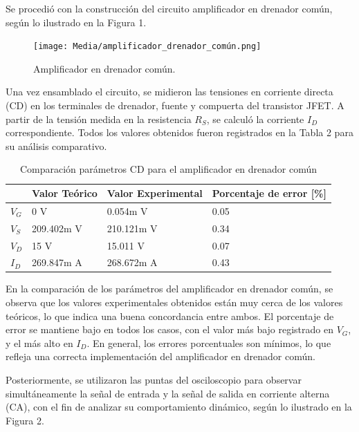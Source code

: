 \documentclass[journal]{IEEEtran}
\begin{document}
	\par Se procedió con la construcción del circuito amplificador en drenador común, según lo ilustrado en la Figura 1. 
	\begin{figure}[H]
		\centering
		\texttt{[image: Media/amplificador\_drenador\_común.png]}
		\caption{Amplificador en drenador común.}
		\label{fig:amplificador_drenador_común}
	\end{figure}
	\par Una vez ensamblado el circuito, se midieron las tensiones en corriente directa (CD) en los terminales de drenador, fuente y compuerta del transistor JFET. A partir de la tensión medida en la resistencia \( R_S \), se calculó la corriente \( I_D \) correspondiente. Todos los valores obtenidos fueron registrados en la Tabla 2 para su análisis comparativo.
	\begin{table}[h]
		\caption{Comparación parámetros CD para el amplificador en drenador común}
		\centering
		\renewcommand{\arraystretch}{1.2} %
		\begin{tabular}{|l|p{2cm}|p{2cm}|p{2cm}|}
			\hline
			& \textbf{Valor Teórico} & \textbf{Valor Experimental} & \textbf{Porcentaje de error [\%]} \\
			\hline
			\( V_G \) & 0 V  & 0.054m V  & 0.05 \\
			\hline
			\( V_S \) & 209.402m V   & 210.121m V  & 0.34 \\
			\hline
			\( V_D \) & 15 V & 15.011 V & 0.07 \\
			\hline
			\( I_D \) & 269.847m A & 268.672m A & 0.43 \\
			\hline
		\end{tabular}
		\label{tab:resistencias2}
	\end{table}
	\par En la comparación de los parámetros del amplificador en drenador común, se observa que los valores experimentales obtenidos están muy cerca de los valores teóricos, lo que indica una buena concordancia entre ambos. El porcentaje de error se mantiene bajo en todos los casos, con el valor más bajo registrado en \( V_G \), y el más alto en \( I_D \). En general, los errores porcentuales son mínimos, lo que refleja una correcta implementación del amplificador en drenador común.
	\par Posteriormente, se utilizaron las puntas del osciloscopio para observar simultáneamente la señal de entrada y la señal de salida en corriente alterna (CA), con el fin de analizar su comportamiento dinámico, según lo ilustrado en la Figura 2. 
\end{document}
